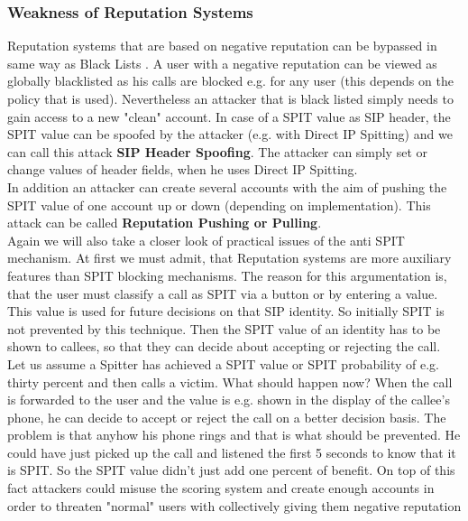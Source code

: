 \documentclass[final
	]{issa}
\begin{document}
\subsubsection{Weakness of Reputation Systems}
Reputation systems that are based on negative reputation can be bypassed in same way as Black Lists \cite{rfc:5039}. A user with a negative reputation can be viewed as globally blacklisted as his calls are blocked e.g. for any user (this depends on the policy that is used). Nevertheless an attacker that is black listed simply needs to gain access to a new "clean" account. In case of a SPIT value as SIP header, the SPIT value can be spoofed by the attacker (e.g. with Direct IP Spitting) and we can call this attack \textbf{SIP Header Spoofing}.
The attacker can simply set or change values of header fields, when he uses Direct IP Spitting.\\
In addition an attacker can create several accounts with the aim of pushing the SPIT value of one account up or down (depending on implementation). This attack can be called \textbf{Reputation Pushing or Pulling}.\\
Again we will also take a closer look of practical issues of the anti SPIT mechanism. At first we must admit, that Reputation systems are more auxiliary features than SPIT blocking mechanisms. The reason for this argumentation is, that the user must classify a call as SPIT via a button or by entering a value. This value is used for future decisions on that SIP identity. So initially SPIT is not prevented by this technique. Then the SPIT value of an identity has to be shown to callees, so that they can decide about accepting or rejecting the call. Let us assume a Spitter has achieved a SPIT value or SPIT probability of e.g. thirty percent and then calls a victim. What should happen now? When the call is forwarded to the user and the value is e.g. shown in the display of the callee's phone, he can decide to accept or reject the call on a better decision basis. The problem is that anyhow his phone rings and that is what should be prevented. He could have just picked up the call and listened the first 5 seconds to know that it is SPIT. So the SPIT value didn't just add one percent of benefit. On top of this fact attackers could misuse the scoring system and create enough accounts in order to threaten "normal" users with collectively giving them negative reputation \cite{rfc:5039}
\end{document}
